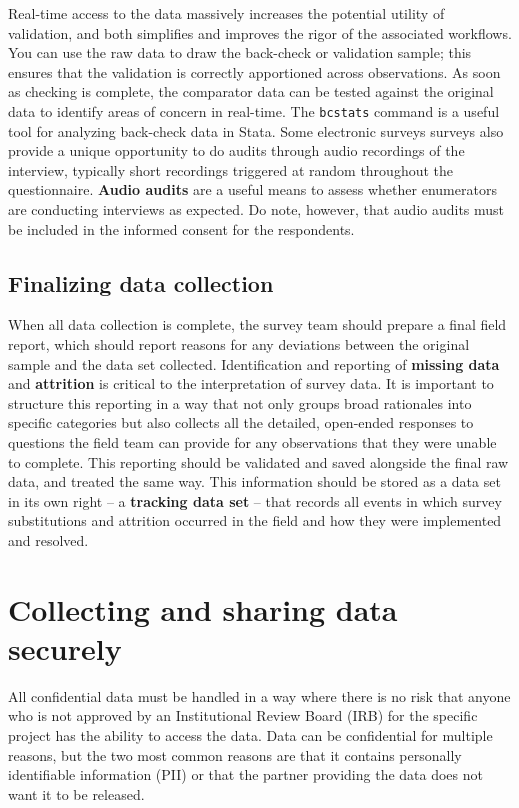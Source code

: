 Real-time access to the data massively increases the potential utility of validation,
and both simplifies and improves the rigor of the associated workflows.
You can use the raw data to draw the back-check or validation sample;
this ensures that the validation is correctly apportioned across observations.
As soon as checking is complete, the comparator data can be tested against
the original data to identify areas of concern in real-time.
The \texttt{bcstats} command is a useful tool for analyzing back-check data in Stata.
Some electronic surveys surveys also provide a unique opportunity
to do audits through audio recordings of the interview,
typically short recordings triggered at random throughout the questionnaire.
\textbf{Audio audits} are a useful means to assess whether enumerators are conducting interviews as expected.
Do note, however, that audio audits must be included in the informed consent for the respondents.

\subsection{Finalizing data collection}

When all data collection is complete, the survey team should prepare a final field report,
which should report reasons for any deviations between the original sample and the data set collected.
Identification and reporting of \textbf{missing data} and \textbf{attrition}
is critical to the interpretation of survey data.
It is important to structure this reporting in a way that not only
groups broad rationales into specific categories
but also collects all the detailed, open-ended responses
to questions the field team can provide for any observations that they were unable to complete.
This reporting should be validated and saved alongside the final raw data, and treated the same way.
This information should be stored as a data set in its own right
-- a \textbf{tracking data set} -- that records all events in which survey substitutions
and attrition occurred in the field and how they were implemented and resolved.

\section{Collecting and sharing data securely}

All confidential data must be handled in a way where there is no risk that anyone who is
not approved by an Institutional Review Board (IRB)
for the specific project has the ability to access the data.
Data can be confidential for multiple reasons, but the two most
common reasons are that it contains personally identifiable information (PII)
or that the partner providing the data does not want it to be released.


